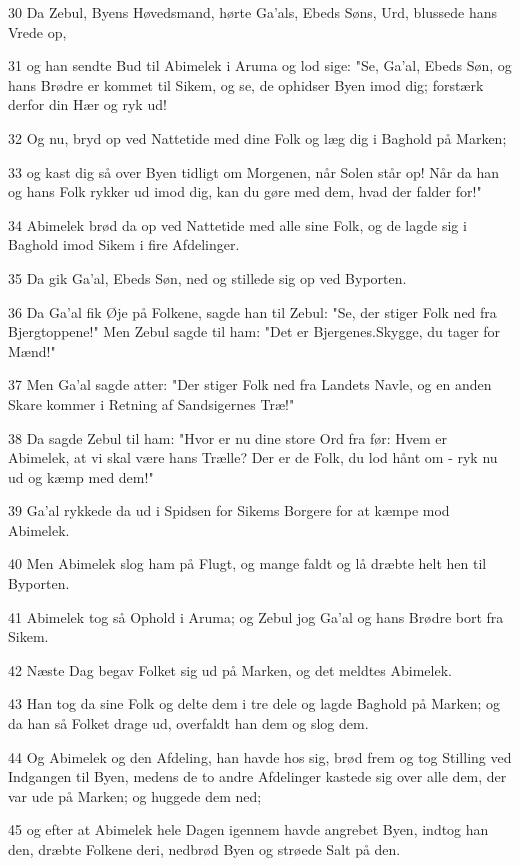 \par 30 Da Zebul, Byens Høvedsmand, hørte Ga'als, Ebeds Søns, Urd, blussede hans Vrede op,
\par 31 og han sendte Bud til Abimelek i Aruma og lod sige: "Se, Ga'al, Ebeds Søn, og hans Brødre er kommet til Sikem, og se, de ophidser Byen imod dig; forstærk derfor din Hær og ryk ud!
\par 32 Og nu, bryd op ved Nattetide med dine Folk og læg dig i Baghold på Marken;
\par 33 og kast dig så over Byen tidligt om Morgenen, når Solen står op! Når da han og hans Folk rykker ud imod dig, kan du gøre med dem, hvad der falder for!"
\par 34 Abimelek brød da op ved Nattetide med alle sine Folk, og de lagde sig i Baghold imod Sikem i fire Afdelinger.
\par 35 Da gik Ga'al, Ebeds Søn, ned og stillede sig op ved Byporten.
\par 36 Da Ga'al fik Øje på Folkene, sagde han til Zebul: "Se, der stiger Folk ned fra Bjergtoppene!" Men Zebul sagde til ham: "Det er Bjergenes.Skygge, du tager for Mænd!"
\par 37 Men Ga'al sagde atter: "Der stiger Folk ned fra Landets Navle, og en anden Skare kommer i Retning af Sandsigernes Træ!"
\par 38 Da sagde Zebul til ham: "Hvor er nu dine store Ord fra før: Hvem er Abimelek, at vi skal være hans Trælle? Der er de Folk, du lod hånt om - ryk nu ud og kæmp med dem!"
\par 39 Ga'al rykkede da ud i Spidsen for Sikems Borgere for at kæmpe mod Abimelek.
\par 40 Men Abimelek slog ham på Flugt, og mange faldt og lå dræbte helt hen til Byporten.
\par 41 Abimelek tog så Ophold i Aruma; og Zebul jog Ga'al og hans Brødre bort fra Sikem.
\par 42 Næste Dag begav Folket sig ud på Marken, og det meldtes Abimelek.
\par 43 Han tog da sine Folk og delte dem i tre dele og lagde Baghold på Marken; og da han så Folket drage ud, overfaldt han dem og slog dem.
\par 44 Og Abimelek og den Afdeling, han havde hos sig, brød frem og tog Stilling ved Indgangen til Byen, medens de to andre Afdelinger kastede sig over alle dem, der var ude på Marken; og huggede dem ned;
\par 45 og efter at Abimelek hele Dagen igennem havde angrebet Byen, indtog han den, dræbte Folkene deri, nedbrød Byen og strøede Salt på den.
